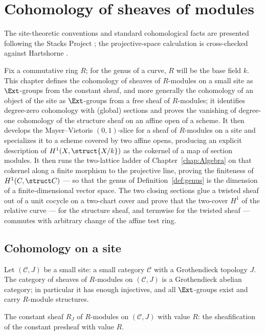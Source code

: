 \chapter{Cohomology of sheaves of modules}
\label{chap:Cohomology}

The site-theoretic conventions and standard cohomological facts are presented following
the Stacks Project \cite{stacks-project}; the projective-space calculation is cross-checked
against Hartshorne \cite{hartshorne-ag}.

Fix a commutative ring \(R\); for the genus of a curve, \(R\) will be the base field \(k\).
This chapter defines the cohomology of sheaves of \(R\)-modules on a small site as
\(\Ext\)-groups from the constant sheaf, and more generally the cohomology of an object of
the site as \(\Ext\)-groups from a free sheaf of \(R\)-modules; it identifies degree-zero
cohomology with (global) sections and proves the vanishing of degree-one cohomology of the
structure sheaf on an affine open of a scheme. It then develops the Mayer--Vietoris
\((0,1)\)-slice for a sheaf of \(R\)-modules on a site and specializes it to a scheme
covered by two affine opens, producing an explicit description of \(H^1(X,\struct{X/k})\)
as the cokernel of a map of section modules. It then runs the
two-lattice ladder of Chapter~\ref{chap:Algebra} on that cokernel along a finite morphism
to the projective line, proving the finiteness of \(H^1(C, \struct C)\) --- so that the
genus of Definition~\ref{def:genus} is the dimension of a finite-dimensional vector space.
The two closing sections glue a twisted sheaf out of a unit cocycle on a two-chart cover
and prove that the two-cover \(H^1\) of the relative curve --- for the structure sheaf,
and termwise for the twisted sheaf --- commutes with arbitrary change of the affine test
ring.

\section{Cohomology on a site}

Let \((\mathcal C, J)\) be a small site: a small category \(\mathcal C\) with a Grothendieck
topology \(J\). The category of sheaves of \(R\)-modules on \((\mathcal C, J)\) is a
Grothendieck abelian category; in particular it has enough injectives, and all
\(\Ext\)-groups exist and carry \(R\)-module structures.

\begin{definition}
  \label{def:constModuleSheaf}
  \leanok
  The constant sheaf \(R_J\) of \(R\)-modules on \((\mathcal C, J)\) with value \(R\): the
  sheafification of the constant presheaf with value \(R\).
\end{definition}

